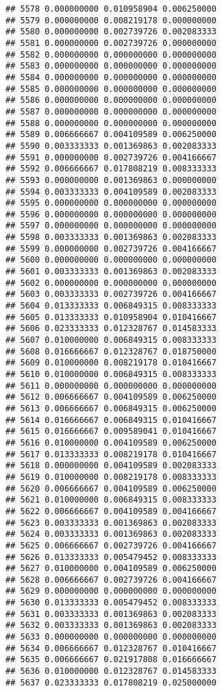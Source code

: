 \documentclass[
]{article}
\begin{document}
\begin{verbatim}
## 5578 0.000000000 0.010958904 0.006250000
## 5579 0.000000000 0.008219178 0.000000000
## 5580 0.000000000 0.002739726 0.002083333
## 5581 0.000000000 0.002739726 0.000000000
## 5582 0.000000000 0.000000000 0.000000000
## 5583 0.000000000 0.000000000 0.000000000
## 5584 0.000000000 0.000000000 0.000000000
## 5585 0.000000000 0.000000000 0.000000000
## 5586 0.000000000 0.000000000 0.000000000
## 5587 0.000000000 0.000000000 0.000000000
## 5588 0.000000000 0.000000000 0.000000000
## 5589 0.006666667 0.004109589 0.006250000
## 5590 0.003333333 0.001369863 0.002083333
## 5591 0.000000000 0.002739726 0.004166667
## 5592 0.006666667 0.017808219 0.008333333
## 5593 0.000000000 0.001369863 0.000000000
## 5594 0.003333333 0.004109589 0.002083333
## 5595 0.000000000 0.000000000 0.000000000
## 5596 0.000000000 0.000000000 0.000000000
## 5597 0.000000000 0.000000000 0.000000000
## 5598 0.003333333 0.001369863 0.002083333
## 5599 0.000000000 0.002739726 0.004166667
## 5600 0.000000000 0.000000000 0.000000000
## 5601 0.003333333 0.001369863 0.002083333
## 5602 0.000000000 0.000000000 0.000000000
## 5603 0.003333333 0.002739726 0.004166667
## 5604 0.013333333 0.006849315 0.008333333
## 5605 0.013333333 0.010958904 0.010416667
## 5606 0.023333333 0.012328767 0.014583333
## 5607 0.010000000 0.006849315 0.008333333
## 5608 0.016666667 0.012328767 0.018750000
## 5609 0.010000000 0.008219178 0.010416667
## 5610 0.010000000 0.006849315 0.008333333
## 5611 0.000000000 0.000000000 0.000000000
## 5612 0.006666667 0.004109589 0.006250000
## 5613 0.006666667 0.006849315 0.006250000
## 5614 0.016666667 0.006849315 0.010416667
## 5615 0.016666667 0.009589041 0.010416667
## 5616 0.010000000 0.004109589 0.006250000
## 5617 0.013333333 0.008219178 0.010416667
## 5618 0.000000000 0.004109589 0.002083333
## 5619 0.010000000 0.008219178 0.008333333
## 5620 0.006666667 0.004109589 0.006250000
## 5621 0.010000000 0.006849315 0.008333333
## 5622 0.006666667 0.004109589 0.004166667
## 5623 0.003333333 0.001369863 0.002083333
## 5624 0.003333333 0.001369863 0.002083333
## 5625 0.006666667 0.002739726 0.004166667
## 5626 0.013333333 0.005479452 0.008333333
## 5627 0.010000000 0.004109589 0.006250000
## 5628 0.006666667 0.002739726 0.004166667
## 5629 0.000000000 0.000000000 0.000000000
## 5630 0.013333333 0.005479452 0.008333333
## 5631 0.003333333 0.001369863 0.002083333
## 5632 0.003333333 0.001369863 0.002083333
## 5633 0.000000000 0.000000000 0.000000000
## 5634 0.006666667 0.012328767 0.010416667
## 5635 0.006666667 0.021917808 0.016666667
## 5636 0.010000000 0.012328767 0.014583333
## 5637 0.023333333 0.017808219 0.025000000

\end{verbatim}
\end{document}
